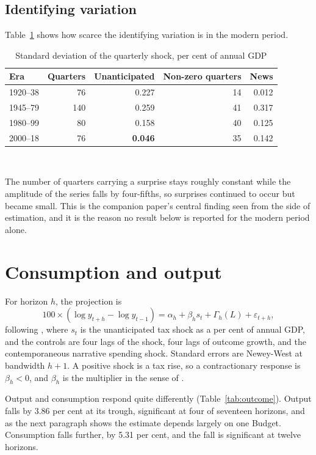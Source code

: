 \documentclass[11pt,a4paper]{article}
\begin{document}
\subsection{Identifying variation}

Table~\ref{tab:var} shows how scarce the identifying variation is in the modern period.

\begin{table}[htbp]
\centering
\caption{Standard deviation of the quarterly shock, per cent of annual GDP}
\label{tab:var}
\begin{tabular}{lrrrr}
\toprule
Era & Quarters & Unanticipated & Non-zero quarters & News \\
\midrule
1920--38 & 76 & 0.227 & 14 & 0.012 \\
1945--79 & 140 & 0.259 & 41 & 0.317 \\
1980--99 & 80 & 0.158 & 40 & 0.125 \\
2000--18 & 76 & \textbf{0.046} & 35 & 0.142 \\
\bottomrule
\end{tabular}
\\[4pt]
\begin{minipage}{0.86\textwidth}
\footnotesize The number of quarters carrying a surprise stays roughly constant while the amplitude
of the series falls by four-fifths, so surprises continued to occur but became small. This is the
companion paper's central finding seen from the side of estimation, and it is the reason no result
below is reported for the modern period alone.
\end{minipage}
\end{table}

\section{Consumption and output}\label{sec:outcome}

For horizon $h$, the projection is
\[
100 \times (\log y_{t+h} - \log y_{t-1}) = \alpha_h + \beta_h s_t + \Gamma_h(L) + \varepsilon_{t+h},
\]
following \citet{jorda2005}, where $s_t$ is the unanticipated tax shock as a per cent of annual GDP,
and the controls are four lags of the shock, four lags of outcome growth, and the contemporaneous
narrative spending shock. Standard errors are Newey-West at bandwidth $h+1$. A positive shock is a
tax rise, so a contractionary response is $\beta_h < 0$, and $\beta_h$ is the multiplier in the sense
of \citet{romer2010}.

Output and consumption respond quite differently (Table~\ref{tab:outcome}). Output falls by 3.86 per
cent at its trough, significant at four of seventeen horizons, and as the next paragraph shows the
estimate depends largely on one Budget. Consumption falls further, by 5.31 per cent, and the fall is
significant at twelve horizons.
\end{document}
